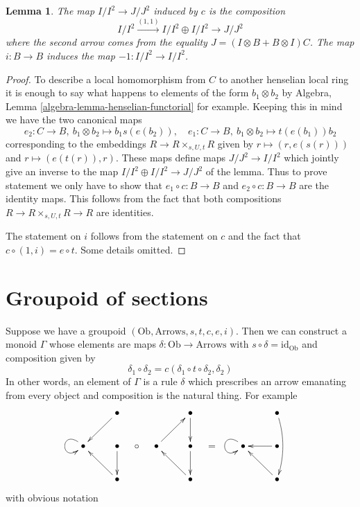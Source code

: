 \documentclass{stacks-project}
\theoremstyle{plain}
\newtheorem{lemma}[subsection]{Lemma}
\theoremstyle{definition}
\theoremstyle{remark}
\numberwithin{equation}{subsection}
\begin{document}
\begin{lemma}
\label{lemma-first-order-structure-c}
The map $I/I^2 \to J/J^2$ induced by $c$ is the composition
$$
I/I^2 \xrightarrow{(1, 1)} I/I^2 \oplus I/I^2 \to J/J^2
$$
where the second arrow comes from the equality
$J = (I \otimes B + B \otimes I)C$.
The map $i : B \to B$ induces the map $-1 : I/I^2 \to I/I^2$.
\end{lemma}

\begin{proof}
To describe a local homomorphism from $C$ to another
henselian local ring it is enough to say what happens
to elements of the form $b_1 \otimes b_2$ by
Algebra, Lemma \ref{algebra-lemma-henselian-functorial}
for example. Keeping this in mind we have the two canonical maps
$$
e_2 : C \to B,\ b_1 \otimes b_2 \mapsto b_1s(e(b_2)),\quad
e_1 : C \to B,\ b_1 \otimes b_2 \mapsto t(e(b_1))b_2
$$
corresponding to the embeddings
$R \to R \times_{s, U, t} R$ given by
$r \mapsto (r, e(s(r)))$ and $r \mapsto (e(t(r)), r)$.
These maps define maps $J/J^2 \to I/I^2$ which jointly
give an inverse to the map $I/I^2 \oplus I/I^2 \to J/J^2$
of the lemma. Thus to prove statement we only have to show
that $e_1 \circ c : B \to B$ and $e_2 \circ c : B \to B$
are the identity maps. This follows from the fact that both
compositions $R \to R \times_{s, U, t} R \to R$ are identities.

\medskip\noindent
The statement on $i$ follows from the statement on $c$ and the
fact that $c \circ (1, i) = e \circ t$. Some details omitted.
\end{proof}








\section{Groupoid of sections}
\label{section-groupoid-sections}

\noindent
Suppose we have a groupoid $(\text{Ob}, \text{Arrows}, s, t, c, e, i)$.
Then we can construct a monoid $\Gamma$ whose elements are
maps $\delta : \text{Ob} \to \text{Arrows}$ with
$s \circ \delta = \text{id}_{\text{Ob}}$ and composition given by
$$
\delta_1 \circ \delta_2 = c(\delta_1 \circ t \circ \delta_2, \delta_2)
$$
In other words, an element of $\Gamma$ is a rule $\delta$ which
prescribes an arrow emanating from every object and composition
is the natural thing. For example
$$
\vcenter{
\xymatrix{
& \bullet \ar[dl] \\
\bullet \ar@(ul, dl)[] & \bullet \ar[d] \\
& \bullet \ar[lu]
}
}
\quad\circ\quad
\vcenter{
\xymatrix{
& \bullet \ar[d] \\
\bullet \ar[ru] & \bullet \ar[d] \\
& \bullet \ar[lu]
}
}
\quad = \quad\quad
\vcenter{
\xymatrix{
& \bullet \ar@/^/[dd] \\
\bullet \ar@(ul, dl)[] & \bullet \ar[l] \\
& \bullet \ar[lu]
}
}
$$
with obvious notation
\end{document}
